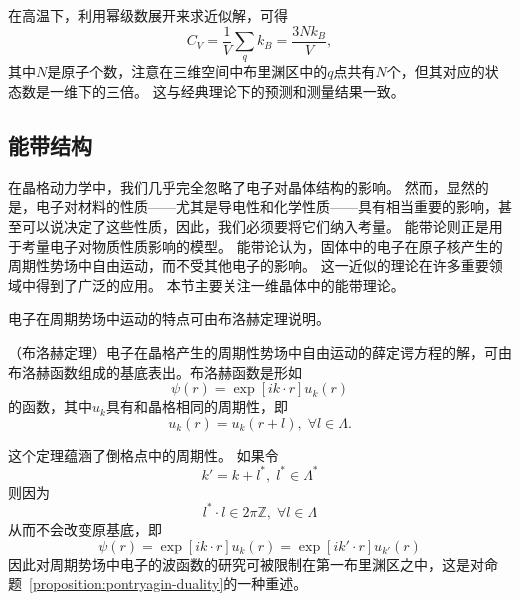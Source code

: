 在高温下，利用幂级数展开来求近似解，可得
\begin{equation}
    C_V = \frac{1}{V} \sum_q k_B = \frac{3 N k_B}{V},
\end{equation}
其中$N$是原子个数，注意在三维空间中布里渊区中的$q$点共有$N$个，但其对应的状态数是一维下的三倍。
这与经典理论下的预测和测量结果一致。

\subsection{能带结构}
在晶格动力学中，我们几乎完全忽略了电子对晶体结构的影响。
然而，显然的是，电子对材料的性质——尤其是导电性和化学性质——具有相当重要的影响，甚至可以说决定了这些性质，因此，我们必须要将它们纳入考量。
能带论则正是用于考量电子对物质性质影响的模型。
能带论认为，固体中的电子在原子核产生的周期性势场中自由运动，而不受其他电子的影响。
这一近似的理论在许多重要领域中得到了广泛的应用。
本节主要关注一维晶体中的能带理论。

电子在周期势场中运动的特点可由布洛赫定理说明。
\begin{theorem}
    （布洛赫定理）电子在晶格产生的周期性势场中自由运动的薛定谔方程的解，可由布洛赫函数组成的基底表出。布洛赫函数是形如
    \begin{equation}
        \psi(r) = \exp[i k \cdot r] u_k(r)
    \end{equation}
    的函数，其中$u_k$具有和晶格相同的周期性，即
    \begin{equation}
        u_k(r) = u_k(r + l), \; \forall l \in \Lambda.
    \end{equation}
\end{theorem}

这个定理蕴涵了倒格点中的周期性。
如果令
\begin{equation}
    k' = k + l^*, \; l^* \in \Lambda^*
\end{equation}
则因为
\begin{equation}
    l^* \cdot l \in 2 \pi \mathbb Z, \; \forall l \in \Lambda
\end{equation}
从而不会改变原基底，即
\begin{equation}
    \psi(r) = \exp[i k \cdot r] u_k(r) = \exp[i k' \cdot r] u_{k'}(r)
\end{equation}
因此对周期势场中电子的波函数的研究可被限制在第一布里渊区之中，这是对命题~\ref{proposition:pontryagin-duality}的一种重述。

